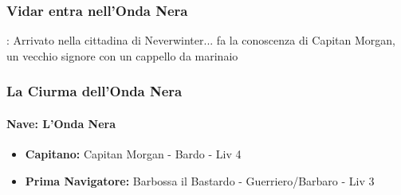 \documentclass{article}
\begin{document}
              \subsubsection{Vidar entra nell'Onda Nera}: 
Arrivato nella cittadina di Neverwinter... fa la conoscenza di Capitan Morgan, un vecchio signore con un cappello da marinaio


              \subsubsection*{La Ciurma dell'Onda Nera}

                  \paragraph*{Nave: L'Onda Nera}

\begin{itemize}
  \item \textbf{Capitano:} Capitan Morgan - Bardo - Liv 4
  \item \textbf{Prima Navigatore:} Barbossa il Bastardo - Guerriero/Barbaro - Liv 3
\end{itemize}
\end{document}
